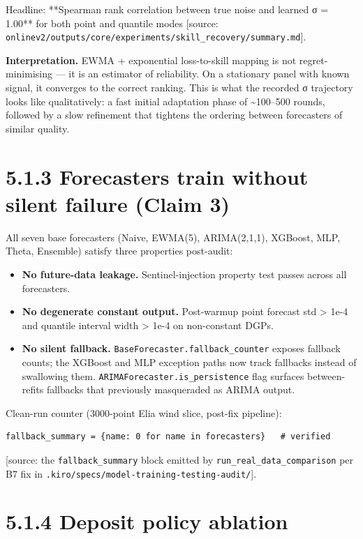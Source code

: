\documentclass[11pt,a4paper,openany]{report}
\begin{document}
Headline: **Spearman rank correlation between true noise and learned
σ = 1.00** for both point and quantile modes
[source: \texttt{onlinev2/outputs/core/experiments/skill\_recovery/summary.md}].

\textbf{Interpretation.} EWMA + exponential loss-to-skill mapping is not
regret-minimising — it is an estimator of reliability. On a stationary
panel with known signal, it converges to the correct ranking. This is
what the recorded σ trajectory looks like qualitatively: a fast initial
adaptation phase of \textasciitilde{}100–500 rounds, followed by a slow refinement
that tightens the ordering between forecasters of similar quality.

\section{5.1.3 Forecasters train without silent failure (Claim 3)}

All seven base forecasters (Naive, EWMA(5), ARIMA(2,1,1), XGBoost, MLP,
Theta, Ensemble) satisfy three properties post-audit:

\begin{itemize}
  \item \textbf{No future-data leakage.} Sentinel-injection property test passes
    across all forecasters.
  \item \textbf{No degenerate constant output.} Post-warmup point forecast std >
    1e-4 and quantile interval width > 1e-4 on non-constant DGPs.
  \item \textbf{No silent fallback.} \texttt{BaseForecaster.fallback\_counter} exposes
    fallback counts; the XGBoost and MLP exception paths now track
    fallbacks instead of swallowing them. \texttt{ARIMAForecaster.is\_persistence}
    flag surfaces between-refits fallbacks that previously masqueraded as
    ARIMA output.
\end{itemize}

Clean-run counter (3000-point Elia wind slice, post-fix pipeline):

\begin{verbatim}
fallback_summary = {name: 0 for name in forecasters}   # verified
\end{verbatim}

[source: the \texttt{fallback\_summary} block emitted by
\texttt{run\_real\_data\_comparison} per B7 fix in
\texttt{.kiro/specs/model-training-testing-audit/}].

\section{5.1.4 Deposit policy ablation}
\end{document}
